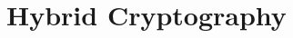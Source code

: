 \section{Hybrid Cryptography}\label{sec:hybrid_cryptography}
\vspace{7.5cm}




\vspace{-1.5mm}
\newpage
